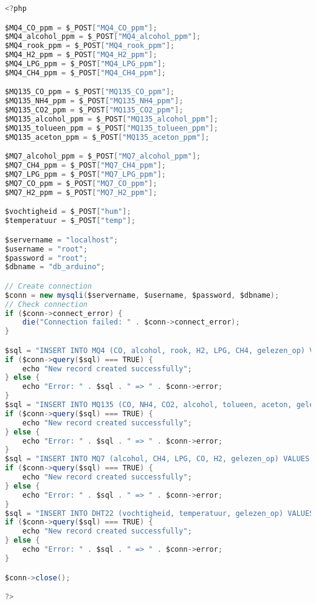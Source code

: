 \begin{lstlisting}[language=Java,caption={insertDB.php}]
<?php

$MQ4_CO_ppm = $_POST["MQ4_CO_ppm"];
$MQ4_alcohol_ppm = $_POST["MQ4_alcohol_ppm"];
$MQ4_rook_ppm = $_POST["MQ4_rook_ppm"];
$MQ4_H2_ppm = $_POST["MQ4_H2_ppm"];
$MQ4_LPG_ppm = $_POST["MQ4_LPG_ppm"];
$MQ4_CH4_ppm = $_POST["MQ4_CH4_ppm"];

$MQ135_CO_ppm = $_POST["MQ135_CO_ppm"];
$MQ135_NH4_ppm = $_POST["MQ135_NH4_ppm"];
$MQ135_CO2_ppm = $_POST["MQ135_CO2_ppm"];
$MQ135_alcohol_ppm = $_POST["MQ135_alcohol_ppm"];
$MQ135_tolueen_ppm = $_POST["MQ135_tolueen_ppm"];
$MQ135_aceton_ppm = $_POST["MQ135_aceton_ppm"];

$MQ7_alcohol_ppm = $_POST["MQ7_alcohol_ppm"];
$MQ7_CH4_ppm = $_POST["MQ7_CH4_ppm"];
$MQ7_LPG_ppm = $_POST["MQ7_LPG_ppm"];
$MQ7_CO_ppm = $_POST["MQ7_CO_ppm"];
$MQ7_H2_ppm = $_POST["MQ7_H2_ppm"];

$vochtigheid = $_POST["hum"];
$temperatuur = $_POST["temp"];

$servername = "localhost";
$username = "root";
$password = "root";
$dbname = "db_arduino";

// Create connection
$conn = new mysqli($servername, $username, $password, $dbname);
// Check connection
if ($conn->connect_error) {
    die("Connection failed: " . $conn->connect_error);
}

$sql = "INSERT INTO MQ4 (CO, alcohol, rook, H2, LPG, CH4, gelezen_op) VALUES ($MQ4_CO_ppm, $MQ4_alcohol_ppm, $MQ4_rook_ppm, $MQ4_H2_ppm, $MQ4_LPG_ppm, $MQ4_CH4_ppm, NOW())";
if ($conn->query($sql) === TRUE) {
    echo "New record created successfully";
} else {
    echo "Error: " . $sql . " => " . $conn->error;
}
$sql = "INSERT INTO MQ135 (CO, NH4, CO2, alcohol, tolueen, aceton, gelezen_op) VALUES ($MQ135_CO_ppm, $MQ135_NH4_ppm, $MQ135_CO2_ppm, $MQ135_alcohol_ppm, $MQ135_tolueen_ppm, $MQ135_aceton_ppm, NOW())";
if ($conn->query($sql) === TRUE) {
    echo "New record created successfully";
} else {
    echo "Error: " . $sql . " => " . $conn->error;
}
$sql = "INSERT INTO MQ7 (alcohol, CH4, LPG, CO, H2, gelezen_op) VALUES ($MQ7_alcohol_ppm, $MQ7_CH4_ppm, $MQ7_LPG_ppm, $MQ7_CO_ppm, $MQ7_H2_ppm, NOW())";
if ($conn->query($sql) === TRUE) {
    echo "New record created successfully";
} else {
    echo "Error: " . $sql . " => " . $conn->error;
}
$sql = "INSERT INTO DHT22 (vochtigheid, temperatuur, gelezen_op) VALUES ($vochtigheid, $temperatuur, NOW())";
if ($conn->query($sql) === TRUE) {
    echo "New record created successfully";
} else {
    echo "Error: " . $sql . " => " . $conn->error;
}

$conn->close();

?>

\end{lstlisting}


